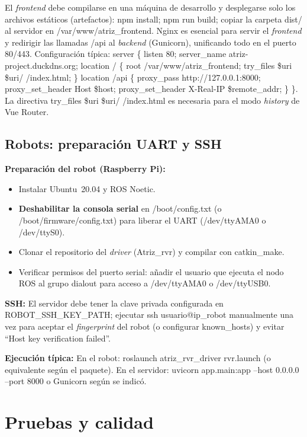\documentclass[12pt]{article}
\numberwithin{figure}{section}
\numberwithin{table}{section}
\def\code#1{#1}%
\def\file#1{#1}%
\newcommand{\code}[1]{\textcolor{codeblue}{\url{#1}}}
\newcommand{\file}[1]{\textcolor{darkblue}{\url{#1}}}
\begin{document}
El \textit{frontend} debe compilarse en una máquina de desarrollo y desplegarse solo los archivos estáticos (artefactos): \code{npm install}; \code{npm run build}; copiar la carpeta \code{dist/} al servidor en \file{/var/www/atriz\_frontend}. Nginx es esencial para servir el \textit{frontend} y redirigir las llamadas \code{/api} al \textit{backend} (Gunicorn), unificando todo en el puerto 80/443. Configuración típica: \code{server \{ listen 80; server\_name atriz-project.duckdns.org; location / \{ root /var/www/atriz\_frontend; try\_files \$uri \$uri/ /index.html; \} location /api \{ proxy\_pass http://127.0.0.1:8000; proxy\_set\_header Host \$host; proxy\_set\_header X-Real-IP \$remote\_addr; \} \}}. La directiva \code{try\_files \$uri \$uri/ /index.html} es necesaria para el modo \emph{history} de Vue Router.

\subsection{Robots: preparación UART y SSH}
\textbf{Preparación del robot (Raspberry Pi):}
\begin{itemize}
    \item Instalar Ubuntu~20.04 y ROS Noetic.
    \item \textbf{Deshabilitar la consola serial} en \file{/boot/config.txt} (o \file{/boot/firmware/config.txt}) para liberar el UART (\code{/dev/ttyAMA0} o \code{/dev/ttyS0}).
    \item Clonar el repositorio del \textit{driver} (\code{Atriz\_rvr}) y compilar con \code{catkin\_make}.
    \item Verificar permisos del puerto serial: añadir el usuario que ejecuta el nodo ROS al grupo \code{dialout} para acceso a \code{/dev/ttyAMA0} o \code{/dev/ttyUSB0}.
\end{itemize}

\textbf{SSH:} El servidor debe tener la clave privada configurada en \code{ROBOT\_SSH\_KEY\_PATH}; ejecutar \code{ssh usuario@ip\_robot} manualmente una vez para aceptar el \textit{fingerprint} del robot (o configurar \code{known\_hosts}) y evitar ``Host key verification failed''.

\textbf{Ejecución típica:} En el robot: \code{roslaunch atriz\_rvr\_driver rvr.launch} (o equivalente según el paquete). En el servidor: \code{uvicorn app.main:app --host 0.0.0.0 --port 8000} o Gunicorn según se indicó.


\section{Pruebas y calidad}
\label{sec:pruebas}
\end{document}
